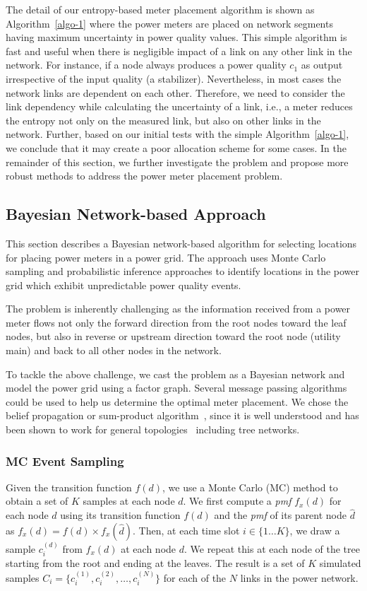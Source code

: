 The detail of our entropy-based meter placement algorithm is shown as Algorithm~\ref{algo-1} where the power meters are placed on network segments having maximum uncertainty in power quality values. This simple algorithm is fast and useful when there is negligible impact of a link on any other link in the network. For instance, if a node always produces a power quality $c_1$ as output irrespective of the input quality (a stabilizer). Nevertheless, in most cases the network links are dependent on each other. Therefore, we need to consider the link dependency while calculating the uncertainty of a link, i.e., a meter reduces the entropy not only on the measured link, but also on other links in the network. Further, based on our initial tests with the simple Algorithm~\ref{algo-1}, we conclude that it may create a poor allocation scheme for some cases. In the remainder of this section, we further investigate the problem and propose more robust methods to address the power meter placement problem. 

\subsection{Bayesian Network-based Approach}
\label{sec:predict} 
This section describes a Bayesian network-based algorithm for selecting locations for placing power meters in a power grid. The approach uses Monte Carlo sampling and probabilistic inference approaches to identify locations in the power grid which exhibit unpredictable power quality events.

The problem is inherently challenging as the information received from a power meter flows not only the forward direction from the root nodes toward the leaf nodes, but also in reverse or upstream direction toward the root node (utility main) and back to all other nodes in the network. 

To tackle the above challenge, we cast the problem as a Bayesian network and model the power grid using a factor graph. Several message passing algorithms could be used to help us determine the optimal meter placement. We chose the belief propagation or sum-product algorithm~\cite{pearl1988probabilistic}, since it is well understood and has been shown to work for general topologies~\cite{yedidia2001generalized} including tree networks.

\subsubsection{MC Event Sampling}
Given the transition function $f(d)$, we use a Monte Carlo (MC) method to obtain a set of $K$ samples at each node $d$. We first compute a \emph{pmf} $f_x{(d)}$ for each node $d$ using its transition function $f(d)$ and the \emph{pmf} of its parent node $\widehat{d}$ as $f_x(d) = f(d) \times f_x(\widehat{d})$. Then, at each time slot $i \in \{1\ldots K\}$, we draw a sample $c_{i}^{(d)}$ from $f_x(d)$ at each node $d$. We repeat this at each node of the tree starting from the root and ending at the leaves. The result is a set of $K$ simulated samples $C_{i}=\{c_{i}^{(1)},c_{i}^{(2)},\ldots,c_{i}^{(N)}\}$ for each of the $N$ links in the power network. 

